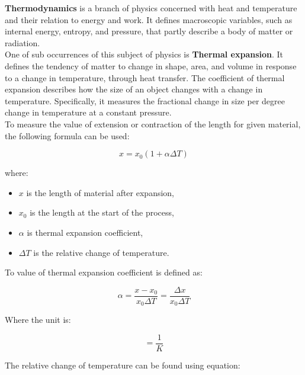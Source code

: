 \documentclass[a4paper]{article}
\begin{document}
\textbf{Thermodynamics} is a branch of physics concerned with heat and temperature and their relation to energy and work. It defines macroscopic variables, such as internal energy, entropy, and pressure, that partly describe a body of matter or radiation. \cite{Art5}\\

One of sub occurrences of this subject of physics is \textbf{Thermal expansion}. It defines the tendency of matter to change in shape, area, and volume in response to a change in temperature, through heat transfer. The coefficient of thermal expansion describes how the size of an object changes with a change in temperature. Specifically, it measures the fractional change in size per degree change in temperature at a constant pressure. \cite{Art1}\\

To measure the value of extension or contraction of the length for given material, the following formula can be used: \cite{Art6}

\clearpage

\begin{equation}
x = x_{0} (1 + \alpha \Delta T)
\end{equation}

where:
\begin{itemize}
	\setlength{\itemsep}{1pt}
	\setlength{\parskip}{0pt}
	\setlength{\parsep}{0pt}
\item $x$ is the length of material after expansion,
\item $x_{0}$ is the length at the start of the process,
\item $\alpha$ is thermal expansion coefficient,
\item $\Delta T$ is the relative change of temperature.\\
\end{itemize}

To value of thermal expansion coefficient is defined as: 

\begin{equation}
\alpha = \frac {x - x_{0}} {x_{0} \Delta T} = \frac {\Delta x} {x_{0} \Delta T}
\end{equation}

Where the unit is:

\begin{equation}
[\alpha] = \frac {1}{K}
\end{equation}

The relative change of temperature can be found using equation: \cite{Art7}
\end{document}
